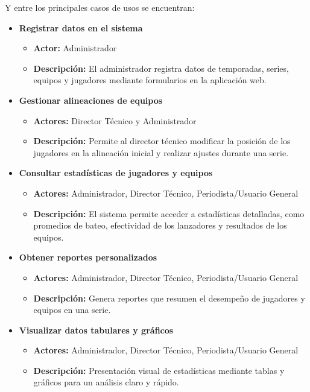 \documentclass{report}
\begin{document}
    Y entre los principales casos de usos se encuentran:
    \begin{itemize}
        \item \textbf{Registrar datos en el sistema}
        \begin{itemize}
            \item \textbf{Actor:} Administrador
            \item \textbf{Descripción:} El administrador registra datos de temporadas, series, equipos y jugadores mediante formularios en la aplicación web.
        \end{itemize}
    
        \item \textbf{Gestionar alineaciones de equipos}
        \begin{itemize}
            \item \textbf{Actores:} Director Técnico y Administrador
            \item \textbf{Descripción:} Permite al director técnico modificar la posición de los jugadores en la alineación inicial y realizar ajustes durante una serie.
        \end{itemize}
    
        \item \textbf{Consultar estadísticas de jugadores y equipos}
        \begin{itemize}
            \item \textbf{Actores:} Administrador, Director Técnico, Periodista/Usuario General
            \item \textbf{Descripción:} El sistema permite acceder a estadísticas detalladas, como promedios de bateo, efectividad de los lanzadores y resultados de los equipos.
        \end{itemize}
    
        \item \textbf{Obtener reportes personalizados}
        \begin{itemize}
            \item \textbf{Actores:} Administrador, Director Técnico, Periodista/Usuario General
            \item \textbf{Descripción:} Genera reportes que resumen el desempeño de jugadores y equipos en una serie.
        \end{itemize}
    
        \item \textbf{Visualizar datos tabulares y gráficos}
        \begin{itemize}
            \item \textbf{Actores:} Administrador, Director Técnico, Periodista/Usuario General
            \item \textbf{Descripción:} Presentación visual de estadísticas mediante tablas y gráficos para un análisis claro y rápido.
        \end{itemize}
    

\end{itemize}
\end{document}
